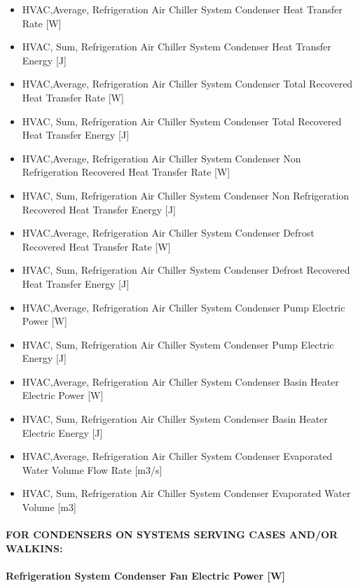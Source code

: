 \begin{itemize}
\item
  HVAC,Average, Refrigeration Air Chiller System Condenser Heat Transfer Rate {[}W{]}
\item
  HVAC, Sum, Refrigeration Air Chiller System Condenser Heat Transfer Energy {[}J{]}
\item
  HVAC,Average, Refrigeration Air Chiller System Condenser Total Recovered Heat Transfer Rate {[}W{]}
\item
  HVAC, Sum, Refrigeration Air Chiller System Condenser Total Recovered Heat Transfer Energy {[}J{]}
\item
  HVAC,Average, Refrigeration Air Chiller System Condenser Non Refrigeration Recovered Heat Transfer Rate {[}W{]}
\item
  HVAC, Sum, Refrigeration Air Chiller System Condenser Non Refrigeration Recovered Heat Transfer Energy {[}J{]}
\item
  HVAC,Average, Refrigeration Air Chiller System Condenser Defrost Recovered Heat Transfer Rate {[}W{]}
\item
  HVAC, Sum, Refrigeration Air Chiller System Condenser Defrost Recovered Heat Transfer Energy {[}J{]}
\item
  HVAC,Average, Refrigeration Air Chiller System Condenser Pump Electric Power {[}W{]}
\item
  HVAC, Sum, Refrigeration Air Chiller System Condenser Pump Electric Energy {[}J{]}
\item
  HVAC,Average, Refrigeration Air Chiller System Condenser Basin Heater Electric Power {[}W{]}
\item
  HVAC, Sum, Refrigeration Air Chiller System Condenser Basin Heater Electric Energy {[}J{]}
\item
  HVAC,Average, Refrigeration Air Chiller System Condenser Evaporated Water Volume Flow Rate {[}m3/s{]}
\item
  HVAC, Sum, Refrigeration Air Chiller System Condenser Evaporated Water Volume {[}m3{]}
\end{itemize}

\paragraph{FOR CONDENSERS ON SYSTEMS SERVING CASES AND/OR WALKINS:}\label{for-condensers-on-systems-serving-cases-andor-walkins-1}

\paragraph{Refrigeration System Condenser Fan Electric Power {[}W{]}}\label{refrigeration-system-condenser-fan-electric-power-w-1}

